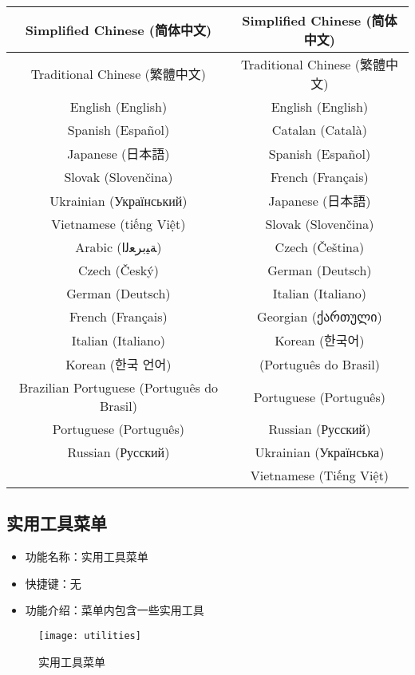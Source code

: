 \documentclass{../../public_resources/doc}
\begin{document}
\begin{longtable}{|c|c|}
    Simplified Chinese (简体中文) & Simplified Chinese (简体中文) \\
    \hline
    Traditional Chinese (繁體中文) & Traditional Chinese (繁體中文) \\
    \hline
    English (English) & English (English) \\
    \hline
    Spanish (Español) & Catalan (Català) \\
    \hline
    Japanese (日本語) & Spanish (Español) \\
    \hline
    Slovak (Slovenčina) & French (Français) \\
    \hline
    Ukrainian (Український) & Japanese (日本語) \\
    \hline
    Vietnamese (tiếng Việt) & Slovak (Slovenčina) \\
    \hline
    Arabic (ﺔﻴﺑﺮﻌﻟﺍ) & Czech (Čeština) \\
    \hline
    Czech (Český) & German (Deutsch) \\
    \hline
    German (Deutsch) & Italian (Italiano) \\
    \hline
    French (Français) & Georgian (ქართული) \\
    \hline
    Italian (Italiano) & Korean (한국어) \\
    \hline
    Korean (한국 언어) & (Português do Brasil) \\
    \hline
    Brazilian Portuguese (Português do Brasil) & Portuguese (Português) \\
    \hline
    Portuguese (Português) & Russian (Русский) \\
    \hline
    Russian (Русский) & Ukrainian (Українська) \\
    \hline
     & Vietnamese (Tiếng Việt) \\
    \hline
\end{longtable}

\subsection{实用工具菜单}
\begin{itemize}
    \item 功能名称：实用工具菜单
    \item 快捷键：无
    \item 功能介绍：菜单内包含一些实用工具
\end{itemize}

\begin{figure}[h!]
    \texttt{[image: utilities]}
    \caption{实用工具菜单}
\end{figure}
\end{document}
